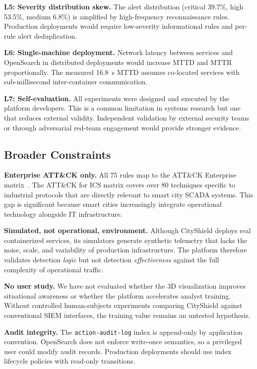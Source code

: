 \documentclass[conference,10pt]{IEEEtran}
\begin{document}
\textbf{L5: Severity distribution skew.} The alert distribution (critical 39.7\%, high 53.5\%, medium 6.8\%) is amplified by high-frequency reconnaissance rules. Production deployments would require low-severity informational rules and per-rule alert deduplication.

\textbf{L6: Single-machine deployment.} Network latency between services and OpenSearch in distributed deployments would increase MTTD and MTTR proportionally. The measured 16.8~s MTTD assumes co-located services with sub-millisecond inter-container communication.

\textbf{L7: Self-evaluation.} All experiments were designed and executed by the platform developers. This is a common limitation in systems research but one that reduces external validity. Independent validation by external security teams or through adversarial red-team engagement would provide stronger evidence.

\subsection{Broader Constraints}

\textbf{Enterprise ATT\&CK only.} All 75 rules map to the ATT\&CK Enterprise matrix~\cite{mitre_attack}. The ATT\&CK for ICS matrix covers over 80 techniques specific to industrial protocols that are directly relevant to smart city SCADA systems. This gap is significant because smart cities increasingly integrate operational technology alongside IT infrastructure.

\textbf{Simulated, not operational, environment.} Although CityShield deploys real containerized services, its simulators generate synthetic telemetry that lacks the noise, scale, and variability of production infrastructure. The platform therefore validates detection \emph{logic} but not detection \emph{effectiveness} against the full complexity of operational traffic.

\textbf{No user study.} We have not evaluated whether the 3D visualization improves situational awareness or whether the platform accelerates analyst training. Without controlled human-subjects experiments comparing CityShield against conventional SIEM interfaces, the training value remains an untested hypothesis.

\textbf{Audit integrity.} The \texttt{action-audit-log} index is append-only by application convention. OpenSearch does not enforce write-once semantics, so a privileged user could modify audit records. Production deployments should use index lifecycle policies with read-only transitions.
\end{document}

